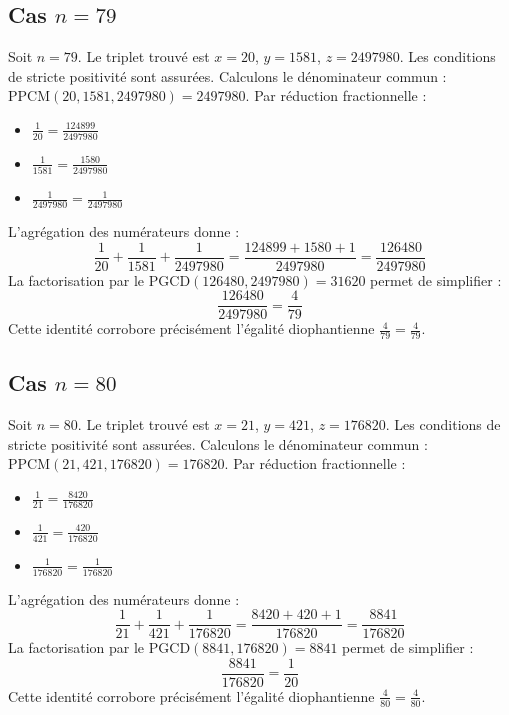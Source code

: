 \documentclass[11pt,a4paper]{article}
\begin{document}
\subsection{Cas $n = 79$}
Soit $n = 79$. Le triplet trouvé est $x = 20$, $y = 1581$, $z = 2497980$.
Les conditions de stricte positivité sont assurées.
Calculons le dénominateur commun : $\text{PPCM}(20, 1581, 2497980) = 2497980$.
Par réduction fractionnelle :
\begin{itemize}
    \item $\frac{1}{20} = \frac{124899}{2497980}$
    \item $\frac{1}{1581} = \frac{1580}{2497980}$
    \item $\frac{1}{2497980} = \frac{1}{2497980}$
\end{itemize}
L'agrégation des numérateurs donne :
$$ \frac{1}{20} + \frac{1}{1581} + \frac{1}{2497980} = \frac{124899 + 1580 + 1}{2497980} = \frac{126480}{2497980} $$
La factorisation par le $\text{PGCD}(126480, 2497980) = 31620$ permet de simplifier :
$$ \frac{126480}{2497980} = \frac{4}{79} $$
Cette identité corrobore précisément l'égalité diophantienne $\frac{4}{79} = \frac{4}{79}$.

\subsection{Cas $n = 80$}
Soit $n = 80$. Le triplet trouvé est $x = 21$, $y = 421$, $z = 176820$.
Les conditions de stricte positivité sont assurées.
Calculons le dénominateur commun : $\text{PPCM}(21, 421, 176820) = 176820$.
Par réduction fractionnelle :
\begin{itemize}
    \item $\frac{1}{21} = \frac{8420}{176820}$
    \item $\frac{1}{421} = \frac{420}{176820}$
    \item $\frac{1}{176820} = \frac{1}{176820}$
\end{itemize}
L'agrégation des numérateurs donne :
$$ \frac{1}{21} + \frac{1}{421} + \frac{1}{176820} = \frac{8420 + 420 + 1}{176820} = \frac{8841}{176820} $$
La factorisation par le $\text{PGCD}(8841, 176820) = 8841$ permet de simplifier :
$$ \frac{8841}{176820} = \frac{1}{20} $$
Cette identité corrobore précisément l'égalité diophantienne $\frac{4}{80} = \frac{4}{80}$.
\end{document}

